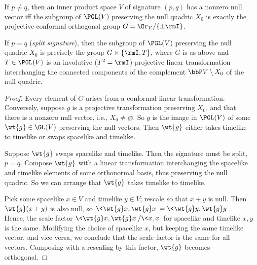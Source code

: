 \begin{lem}\label{lem null quadric isometries}
    If $p\neq q$, then an inner product space $V$ of signature $(p,q)$ has a nonzero null vector iff the subgroup of $\PGL(V)$ preserving the null quadric $X_0$ is exactly the projective conformal orthogonal group $G=\Or_V\slash\{\pm \rmI\}$. 

    If $p=q$ (\emph{split signature}), then the subgroup of $\PGL(V)$ preserving the null quadric $X_0$ is precisely the group $G\ltimes \{\rmI,T\}$, where $G$ is as above and $T\in \PGL(V)$ is an involutive ($T^2=\rmI$) projective linear transformation interchanging the connected components of the complement $\bbP V\setminus X_0$ of the null quadric. 
\end{lem}
\begin{proof}
    Every element of $G$ arises from a conformal linear transformation. Conversely, suppose $g$ is a projective transformation preserving $X_0$, and that there is a nonzero null vector, i.e., $X_0\neq \varnothing$. So $g$ is the image in $\PGL(V)$ of some $\wt{g}\in\GL(V)$ preserving the null vectors. Then $\wt{g}$ either takes timelike to timelike or swaps spacelike and timelike.
    
    Suppose $\wt{g}$ swaps spacelike and timelike. Then the signature must be split, $p=q$. Compose $\wt{g}$ with a linear transformation interchanging the spacelike and timelike elements of some orthonormal basis, thus preserving the null quadric. So we can arrange that $\wt{g}$ takes timelike to timelike.

    Pick some spacelike $x\in V$ and timelike $y\in V$; rescale so that $x+y$ is null. Then $\wt{g}(x+y)$ is also null, so $\<\wt{g}x,\wt{g}x\>=\<\wt{g}y,\wt{g}y\>$. Hence, the scale factor $\<\wt{g}x,\wt{g}x\>/\<x,x\>$ for spacelike and timelike $x,y$ is the same. Modifying the choice of spacelike $x$, but keeping the same timelike vector, and vice versa, we conclude that the scale factor is the same for all vectors. Composing with a rescaling by this factor, $\wt{g}$ becomes orthogonal.
\end{proof}

